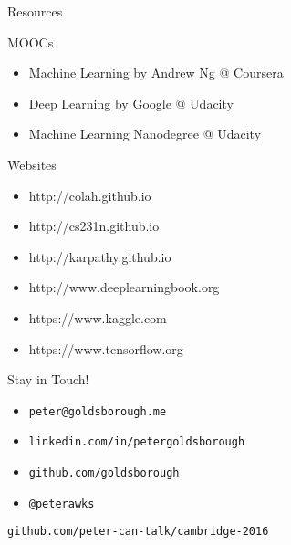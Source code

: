

\begin{slide}{Resources}
  \begin{itemize}
    \pitem MOOCs
    \begin{itemize}
      \item Machine Learning by Andrew Ng @ Coursera
      \item Deep Learning by Google @ Udacity
      \item Machine Learning Nanodegree @ Udacity
    \end{itemize}
    \pitem Websites
    \begin{itemize}
      \item http://colah.github.io
      \item http://cs231n.github.io
      \item http://karpathy.github.io
      \item http://www.deeplearningbook.org
      \item https://www.kaggle.com
      \item https://www.tensorflow.org
    \end{itemize}
  \end{itemize}
\end{slide}

\begin{slide}{}
  {\huge Stay in Touch!}\\
  \vspace{1cm}
  \begin{itemize}
    \item \texttt{peter@goldsborough.me}
    \item \texttt{linkedin.com/in/petergoldsborough}
    \item \texttt{github.com/goldsborough}
    \item \texttt{@peterawks}
  \end{itemize}

  \pause
  \vspace{1cm}
  \texttt{github.com/peter-can-talk/cambridge-2016}
\end{slide}

